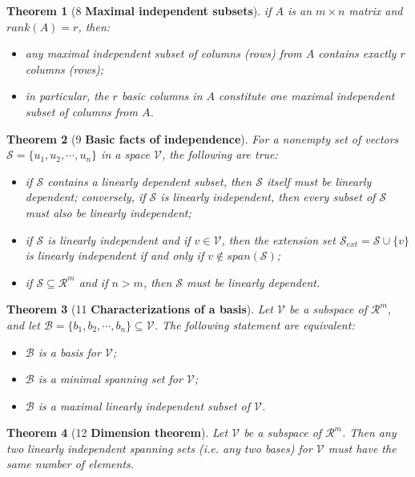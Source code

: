 \documentclass[10.5pt]{article}
\newtheorem{theo}{Theorem}
\begin{document}
\begin{theo}[8 \textbf{Maximal independent subsets}]
if $A$ is an $m\times n$ matrix and $rank(A) = r$, then:
\begin{itemize}
\item any maximal independent subset of columns (rows) from $A$ contains exactly $r$ columns (rows);
\item in particular, the $r$ basic columns in $A$ constitute one maximal independent subset of columns from $A$.
\end{itemize}
\end{theo}
\begin{theo}[9 \textbf{Basic facts of independence}]
For a nonempty set of vectors $\mathcal{S} = \{u_1, u_2,\cdots , u_n\}$ in a space $\mathcal{V}$, the following are true:
\begin{itemize}
\item if $\mathcal{S}$ contains a linearly dependent subset, then $\mathcal{S}$ itself must be linearly dependent; conversely, if $\mathcal{S}$ is linearly independent, then every subset of $\mathcal{S}$ must also be linearly independent;
\item if $\mathcal{S}$ is linearly independent and if $v \in \mathcal{V}$, then the extension set $\mathcal{S}_{ext}=\mathcal{S} \cup \{v\}$ is linearly independent if and only if $v \notin span(\mathcal{S})$;
\item if $\mathcal{S}  \subseteq \mathcal{R}^m$ and if $n > m$, then $\mathcal{S}$ must be linearly dependent.
\end{itemize}
\end{theo}
\begin{theo}[11 \textbf{Characterizations of a basis}]
Let $\mathcal{V}$ be a subspace of $\mathcal{R}^m$, and let $\mathcal{B}=\{b_1,b_2,\cdots ,b_n \}\subseteq \mathcal{V}$. The following statement are equivalent:
\begin{itemize}
\item $\mathcal{B}$ is a basis for $\mathcal{V}$;
\item $\mathcal{B}$ is a minimal spanning set for $\mathcal{V}$;
\item $\mathcal{B}$ is a maximal linearly independent subset of $\mathcal{V}$.
\end{itemize}
\end{theo}
\begin{theo}[12 \textbf{Dimension theorem}]
Let $\mathcal{V}$ be a subspace of $\mathcal{R}^m$. Then any two linearly independent spanning sets (i.e. any two bases) for $\mathcal{V}$ must have the same number of elements.
\end{theo}
\end{document}
